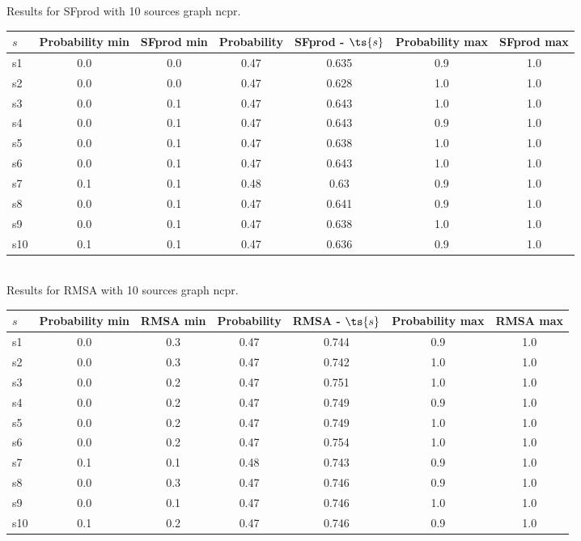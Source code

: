 \documentclass{article}
\begin{document}
\noindent Results for SFprod with 10 sources graph ncpr.

\noindent\begin{tabular}{|l|c|c|c|c|c|c|}
\hline
$s$& Probability min & SFprod min & Probability & SFprod - $\ts{s}$ & Probability max & SFprod max\\
\hline
s1 &0.0 & 0.0 & 0.47 & 0.635 & 0.9 & 1.0\\
\hline
s2 &0.0 & 0.0 & 0.47 & 0.628 & 1.0 & 1.0\\
\hline
s3 &0.0 & 0.1 & 0.47 & 0.643 & 1.0 & 1.0\\
\hline
s4 &0.0 & 0.1 & 0.47 & 0.643 & 0.9 & 1.0\\
\hline
s5 &0.0 & 0.1 & 0.47 & 0.638 & 1.0 & 1.0\\
\hline
s6 &0.0 & 0.1 & 0.47 & 0.643 & 1.0 & 1.0\\
\hline
s7 &0.1 & 0.1 & 0.48 & 0.63 & 0.9 & 1.0\\
\hline
s8 &0.0 & 0.1 & 0.47 & 0.641 & 0.9 & 1.0\\
\hline
s9 &0.0 & 0.1 & 0.47 & 0.638 & 1.0 & 1.0\\
\hline
s10 &0.1 & 0.1 & 0.47 & 0.636 & 0.9 & 1.0\\
\hline
\end{tabular}\\

\noindent Results for RMSA with 10 sources graph ncpr.

\noindent\begin{tabular}{|l|c|c|c|c|c|c|}
\hline
$s$& Probability min & RMSA min & Probability & RMSA - $\ts{s}$ & Probability max & RMSA max\\
\hline
s1 &0.0 & 0.3 & 0.47 & 0.744 & 0.9 & 1.0\\
\hline
s2 &0.0 & 0.3 & 0.47 & 0.742 & 1.0 & 1.0\\
\hline
s3 &0.0 & 0.2 & 0.47 & 0.751 & 1.0 & 1.0\\
\hline
s4 &0.0 & 0.2 & 0.47 & 0.749 & 0.9 & 1.0\\
\hline
s5 &0.0 & 0.2 & 0.47 & 0.749 & 1.0 & 1.0\\
\hline
s6 &0.0 & 0.2 & 0.47 & 0.754 & 1.0 & 1.0\\
\hline
s7 &0.1 & 0.1 & 0.48 & 0.743 & 0.9 & 1.0\\
\hline
s8 &0.0 & 0.3 & 0.47 & 0.746 & 0.9 & 1.0\\
\hline
s9 &0.0 & 0.1 & 0.47 & 0.746 & 1.0 & 1.0\\
\hline
s10 &0.1 & 0.2 & 0.47 & 0.746 & 0.9 & 1.0\\
\hline
\end{tabular}\\
\end{document}
